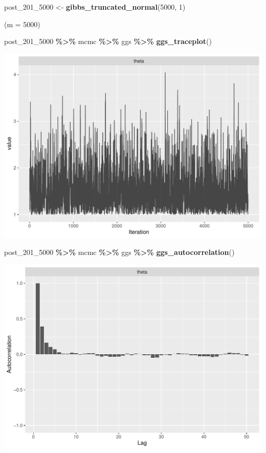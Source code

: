 \documentclass[
]{article}
\newenvironment{Shaded}{\begin{snugshade}}{\end{snugshade}}
\newcommand{\DecValTok}[1]{\textcolor[rgb]{0.00,0.00,0.81}{#1}}
\newcommand{\FunctionTok}[1]{\textcolor[rgb]{0.13,0.29,0.53}{\textbf{#1}}}
\newcommand{\NormalTok}[1]{#1}
\newcommand{\OtherTok}[1]{\textcolor[rgb]{0.56,0.35,0.01}{#1}}
\newcommand{\SpecialCharTok}[1]{\textcolor[rgb]{0.81,0.36,0.00}{\textbf{#1}}}
\begin{document}
\begin{Shaded}
\begin{Highlighting}[]
\NormalTok{post\_201\_5000 }\OtherTok{\textless{}{-}} \FunctionTok{gibbs\_truncated\_normal}\NormalTok{(}\DecValTok{5000}\NormalTok{, }\DecValTok{1}\NormalTok{)}
\end{Highlighting}
\end{Shaded}

(m = 5000)

\begin{Shaded}
\begin{Highlighting}[]
\NormalTok{post\_201\_5000 }\SpecialCharTok{\%\textgreater{}\%}\NormalTok{ mcmc }\SpecialCharTok{\%\textgreater{}\%}\NormalTok{ ggs }\SpecialCharTok{\%\textgreater{}\%} \FunctionTok{ggs\_traceplot}\NormalTok{()}
\end{Highlighting}
\end{Shaded}

\begin{center}\includegraphics[width=0.8\linewidth]{Bayes_stat_hw3_files/figure-latex/unnamed-chunk-34-1} \end{center}

\begin{Shaded}
\begin{Highlighting}[]
\NormalTok{post\_201\_5000 }\SpecialCharTok{\%\textgreater{}\%}\NormalTok{ mcmc }\SpecialCharTok{\%\textgreater{}\%}\NormalTok{ ggs }\SpecialCharTok{\%\textgreater{}\%} \FunctionTok{ggs\_autocorrelation}\NormalTok{()}
\end{Highlighting}
\end{Shaded}

\begin{center}\includegraphics[width=0.8\linewidth]{Bayes_stat_hw3_files/figure-latex/unnamed-chunk-34-2} \end{center}
\end{document}
